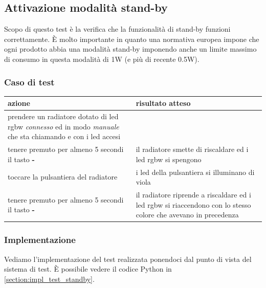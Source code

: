 \documentclass[12pt,a4paper,twoside,titlepage]{book}
\begin{document}
\subsection{Attivazione modalità stand-by}
\label{section:test_standby}

Scopo di questo test è la verifica che la funzionalità di stand-by funzioni correttamente.
È molto importante in quanto una normativa europea impone che ogni prodotto abbia una
modalità stand-by imponendo anche un limite massimo di consumo in questa modalità di 1W
(e più di recente 0.5W).

\subsubsection{Caso di test}
\begin{center}
\begin{tabular}{| p{} | p{} |}
    \hline 
    \textbf{azione} & \textbf{risultato atteso} \\ \hline
    prendere un radiatore dotato di \acrshort{led} \acrshort{rgbw} \textit{connesso} ed in modo \textit{manuale} che sta chiamando e con i \acrshort{led} accesi & \\ \hline
    tenere premuto per almeno 5 secondi il tasto \textbf{-} & il radiatore smette di riscaldare ed i \acrshort{led} \acrshort{rgbw} si spengono \\ \hline
    toccare la pulsantiera del radiatore & i \acrshort{led} della pulsantiera si illuminano di viola \\ \hline
    tenere premuto per almeno 5 secondi il tasto \textbf{-} & il radiatore riprende a riscaldare ed i \acrshort{led} \acrshort{rgbw} si riaccendono con lo stesso colore che avevano in precedenza \\ \hline
\end{tabular}
\end{center}

\subsubsection{Implementazione}
Vediamo l'implementazione del test realizzata ponendoci dal punto di vista del sistema di test. 
È possibile vedere il codice Python in \autoref{section:impl_test_standby}.
\end{document}
